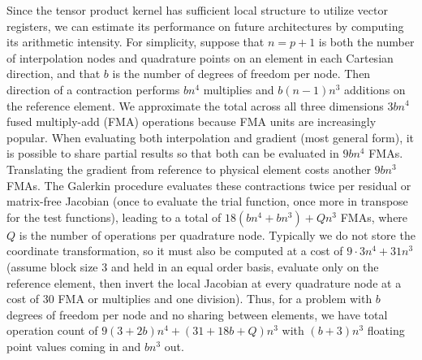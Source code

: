 Since the tensor product kernel has sufficient local structure to utilize vector registers, we can estimate its performance on future architectures by computing its arithmetic intensity.
For simplicity, suppose that $n = p+1$ is both the number of interpolation nodes and quadrature points on an element in each Cartesian direction, and that $b$ is the number of degrees of freedom per node.
Then direction of a contraction performs $bn^4$ multiplies and $b(n-1)n^3$ additions on the reference element.
We approximate the total across all three dimensions $3bn^4$ fused multiply-add (FMA) operations because FMA units are increasingly popular.
When evaluating both interpolation and gradient (most general form), it is possible to share partial results so that both can be evaluated in $9bn^4$ FMAs.
Translating the gradient from reference to physical element costs another $9bn^3$ FMAs.
The Galerkin procedure evaluates these contractions twice per residual or matrix-free Jacobian (once to evaluate the trial function, once more in transpose for the test functions), leading to a total of $18(bn^4 + bn^3) + Qn^3$ FMAs, where $Q$ is the number of operations per quadrature node.
Typically we do not store the coordinate transformation, so it must also be computed at a cost of $9\cdot 3n^4 + 31n^3$ (assume block size 3 and held in an equal order basis, evaluate only on the reference element, then invert the local Jacobian at every quadrature node at a cost of 30 FMA or multiplies and one division).
Thus, for a problem with $b$ degrees of freedom per node and no sharing between elements, we have total operation count of $9(3 + 2b)n^4 + (31+18b + Q)n^3$ with $(b+3)n^3$ floating point values coming in and $bn^3$ out.

